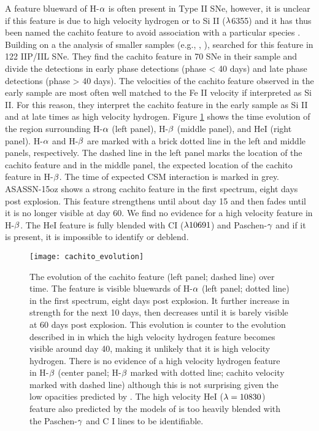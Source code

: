 \documentclass[a4paper,fleqn,usenatbib]{mnras}
\begin{document}
A feature blueward of H-$\rm{\alpha}$ is often present in Type II SNe, however, it is unclear if this feature is due to high velocity hydrogen or to Si II ($\rm{\lambda}$6355)
and it has thus been named the cachito feature to avoid association with a particular species \citep{2017gutierrez}.
Building on a the analysis of smaller samples (e.g.\citealt{2001leonard}, \citet{2013inserra}, \citealt{2014valenti}), \citet{2017gutierrez} searched for this feature in 122 IIP/IIL SNe. 
They find the cachito feature in 70 SNe in their sample and divide the detections in early phase detections (phase < 40 days) and late phase detections (phase > 40 days).
The velocities of the cachito feature observed in the early sample are most often well matched to the Fe II velocity if interpreted as Si II. 
For this reason, they interpret the cachito feature in the early sample as Si II and at late times as high velocity hydrogen.
Figure \ref{fig:CachitoEvolve} shows the time evolution of the region surrounding H-$\rm{\alpha}$ (left panel), H-$\rm{\beta}$ (middle panel), and HeI (right panel).
H-$\rm{\alpha}$ and H-$\rm{\beta}$ are marked with a brick dotted line in the left and middle panels, respectively.
The dashed line in the left panel marks the location of the cachito feature and in the middle panel, the expected location of the cachito feature in H-$\rm{\beta}$.
The time of expected CSM interaction is marked in grey.
ASASSN-15oz shows a strong cachito feature in the first spectrum, eight days post explosion. 
This feature strengthens until about day 15 and then fades until it is no longer visible at day 60. 
We find no evidence for a high velocity feature in H-$\rm{\beta}$.
The HeI feature is fully blended with CI ($\rm{\lambda 10691}$) and Paschen-$\rm{\gamma}$ and if it is present, it is impossible to identify or deblend.
\begin{figure}
\begin{center}
\texttt{[image: cachito\_evolution]}
\caption{The evolution of the cachito feature (left panel; dashed line) over time. 
The feature is visible bluewards of H-$\rm{\alpha}$ (left panel; dotted line)  in the first spectrum, eight days post explosion.
It further increase in strength for the next 10 days, then decreases until it is barely visible at 60 days post explosion.
This evolution is counter to the evolution described in \citet{2007chugai} in which the high velocity hydrogen feature becomes visible around day 40, making it unlikely that it is high velocity hydrogen.
There is no evidence of a high velocity hydrogen feature in H-$\rm{\beta}$ (center panel; H-$\rm{\beta}$ marked with dotted line; cachito velocity marked with dashed line) although this is not surprising given the low opacities predicted by \citet{2007chugai}.
The high velocity HeI ($\rm{\lambda=10830}$) feature also predicted by the models of \citet{2007chugai} is too heavily blended with the Paschen-$\rm{\gamma}$ and C I lines to be identifiable.}
\label{fig:CachitoEvolve}
\end{center}
\end{figure}
\end{document}
